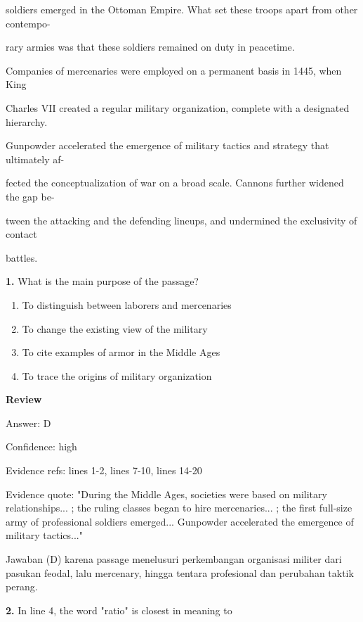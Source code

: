 \documentclass[12pt]{article}
\begin{document}
soldiers emerged in the Ottoman Empire. What set these troops apart from other contempo-\par
rary armies was that these soldiers remained on duty in peacetime.\par
Companies of mercenaries were employed on a permanent basis in 1445, when King\par
Charles VII created a regular military organization, complete with a designated hierarchy.\par
Gunpowder accelerated the emergence of military tactics and strategy that ultimately af-\par
fected the conceptualization of war on a broad scale. Cannons further widened the gap be-\par
tween the attacking and the defending lineups, and undermined the exclusivity of contact\par
battles.\par
\endgroup
\medskip
\noindent\textbf{1.} What is the main purpose of the passage?
\begin{enumerate}[label=(\Alph*),leftmargin=*,itemsep=0.2em]
\item To distinguish between laborers and mercenaries
\item To change the existing view of the military
\item To cite examples of armor in the Middle Ages
\item To trace the origins of military organization
\end{enumerate}
\par
\begingroup
\setlength{\parskip}{0pt}
\setlength{\parindent}{0pt}
\textbf{Review}\par
Answer: D\par
Confidence: high\par
Evidence refs: lines 1-2, lines 7-10, lines 14-20\par
Evidence quote: "During the Middle Ages, societies were based on military relationships... ; the ruling classes began to hire mercenaries... ; the first full-size army of professional soldiers emerged... Gunpowder accelerated the emergence of military tactics..."\par
Jawaban (D) karena passage menelusuri perkembangan organisasi militer dari pasukan feodal, lalu mercenary, hingga tentara profesional dan perubahan taktik perang.\par
\endgroup
\par
\vspace{0.25\baselineskip}
\noindent\textbf{2.} In line 4, the word "ratio" is closest in meaning to
\end{document}

